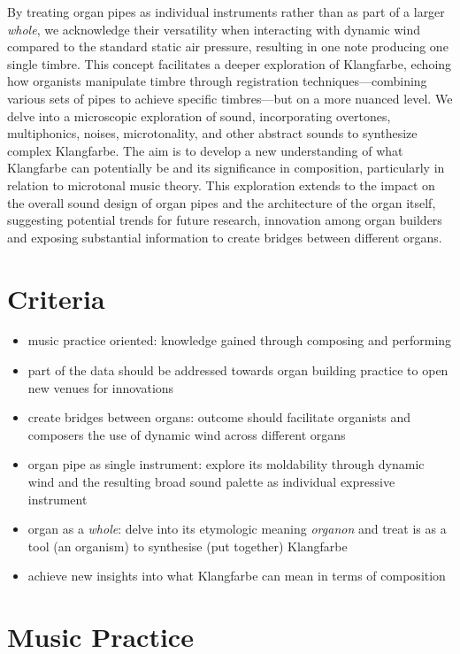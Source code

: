 By treating organ pipes as individual instruments rather than as part of a larger \textit{whole}, we acknowledge their versatility when interacting with dynamic wind compared to the standard static air pressure, resulting in one note producing one single timbre. This concept facilitates a deeper exploration of Klangfarbe, echoing how organists manipulate timbre through registration techniques—combining various sets of pipes to achieve specific timbres—but on a more nuanced level. We delve into a microscopic exploration of sound, incorporating overtones, multiphonics, noises, microtonality, and other abstract sounds to synthesize complex Klangfarbe. The aim is to develop a new understanding of what Klangfarbe can potentially be and its significance in composition, particularly in relation to microtonal music theory. This exploration extends to the impact on the overall sound design of organ pipes and the architecture of the organ itself, suggesting potential trends for future research, innovation among organ builders and exposing substantial information to create bridges between different organs. 

\section{Criteria}

\begin{itemize}
\item music practice oriented: knowledge gained through composing and performing 
\item part of the data should be addressed towards organ building practice to open new venues for innovations
\item create bridges between organs: outcome should facilitate organists and composers the use of dynamic wind across different organs
\item organ pipe as single instrument: explore its moldability through dynamic wind and the resulting broad sound palette as individual expressive instrument 
\item organ as a \textit{whole}:  delve into its etymologic meaning \textit{organon} and treat is as a tool (an organism) to synthesise (put together) Klangfarbe 
\item achieve new insights into what Klangfarbe can mean in terms of composition
\end{itemize}

\section{Music Practice}

